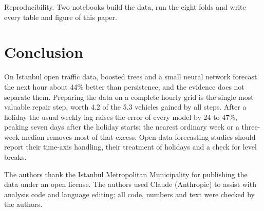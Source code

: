 \documentclass[sigconf]{acmart}
\begin{document}
Reproducibility. Two notebooks build the data, run the eight folds and write every table and figure of this paper.

\section{Conclusion}
On Istanbul open traffic data, boosted trees and a small neural network forecast the next hour about 44\% better than persistence, and the evidence does not separate them. Preparing the data on a complete hourly grid is the single most valuable repair step, worth 4.2 of the 5.3 vehicles gained by all steps. After a holiday the usual weekly lag raises the error of every model by 24 to 47\%, peaking seven days after the holiday starts; the nearest ordinary week or a three-week median removes most of that excess. Open-data forecasting studies should report their time-axis handling, their treatment of holidays and a check for level breaks.

\begin{acks}
The authors thank the Istanbul Metropolitan Municipality for publishing the data under an open license. The authors used Claude (Anthropic) to assist with analysis code and language editing; all code, numbers and text were checked by the authors.
\end{acks}



\end{document}
